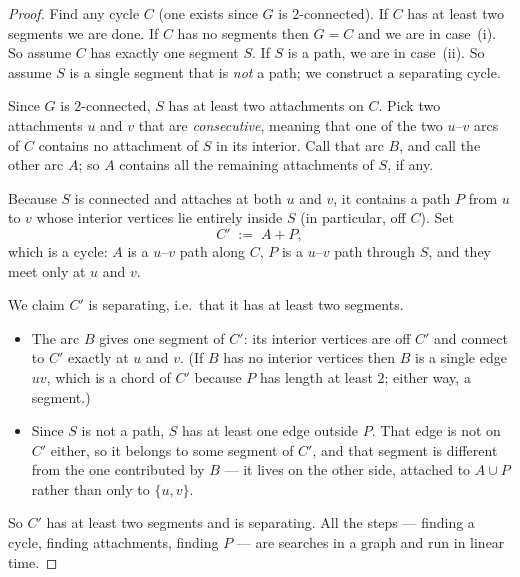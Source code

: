 \begin{proof}
Find any cycle $C$ (one exists since $G$ is $2$-connected). If $C$ has at
least two segments we are done. If $C$ has no segments then $G = C$ and we are
in case~(i). So assume $C$ has exactly one segment $S$. If $S$ is a path, we
are in case~(ii). So assume $S$ is a single segment that is \emph{not} a path;
we construct a separating cycle.

Since $G$ is $2$-connected, $S$ has at least two attachments on $C$. Pick two
attachments $u$ and $v$ that are \emph{consecutive}, meaning that one of the
two $u$--$v$ arcs of $C$ contains no attachment of $S$ in its interior. Call
that arc $B$, and call the other arc $A$; so $A$ contains all the remaining
attachments of $S$, if any.

Because $S$ is connected and attaches at both $u$ and $v$, it contains a path
$P$ from $u$ to $v$ whose interior vertices lie entirely inside $S$ (in
particular, off $C$). Set
\[
  C' \;:=\; A + P ,
\]
which is a cycle: $A$ is a $u$--$v$ path along $C$, $P$ is a $u$--$v$ path
through $S$, and they meet only at $u$ and $v$.

We claim $C'$ is separating, i.e.\ that it has at least two segments.
\begin{itemize}[nosep]
  \item The arc $B$ gives one segment of $C'$: its interior vertices are off
        $C'$ and connect to $C'$ exactly at $u$ and $v$. (If $B$ has no
        interior vertices then $B$ is a single edge $uv$, which is a chord of
        $C'$ because $P$ has length at least $2$; either way, a segment.)
  \item Since $S$ is not a path, $S$ has at least one edge outside $P$. That
        edge is not on $C'$ either, so it belongs to some segment of $C'$, and
        that segment is different from the one contributed by $B$ --- it lives
        on the other side, attached to $A \cup P$ rather than only to
        $\{u,v\}$.
\end{itemize}
So $C'$ has at least two segments and is separating. All the steps ---
finding a cycle, finding attachments, finding $P$ --- are searches in a graph
and run in linear time.
\end{proof}

